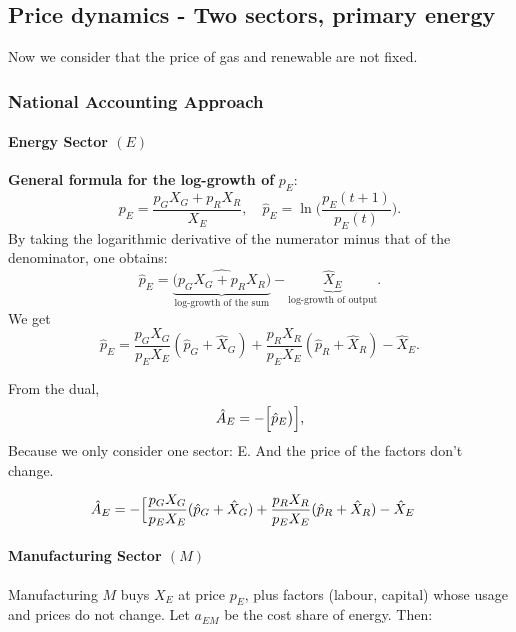 \documentclass[11pt]{article}
\begin{document}
\subsection{Price dynamics - Two sectors, primary energy}

Now we consider that the price of gas and renewable are not fixed.

\bigskip

\subsubsection{ National Accounting Approach}

\paragraph{Energy Sector \((E)\)}

\noindent
\textbf{General formula for the log-growth of }\(p_E\):
\[
  p_E 
   =  
  \frac{p_G X_G  +  p_R X_R}{ X_E },
  \quad
  \hat{p}_E  =  \ln\!\biggl(\frac{p_E(t+1)}{ p_E(t)\!}\biggr).
\]
By taking the logarithmic derivative of the numerator minus that of the denominator, one obtains:
\[
  \hat{p}_E
   = 
  \underbrace{
    \widehat{\bigl(p_G X_G + p_R X_R\bigr)}
  }_{\text{log-growth of the sum}}
   - 
  \underbrace{
    \hat{X}_E
  }_{\text{log-growth of output}}
   .
\]
We get
\[
    \hat{p}_E
     = 
    \frac{p_G X_G}{p_E X_E} 
      (\hat{p}_G + \hat{X}_G)
     + 
    \frac{p_R X_R}{p_E X_E} 
      (\hat{p}_R + \hat{X}_R)
     - 
    \hat{X}_E.
\]

From the dual,
\[
  \hat{A}_E
   = 
  - \Bigl[
        \hat{p}_E
         \bigr)
      \Bigr],
\]
Because we only consider one sector: E. And the price of the factors don't change.

\begin{align*}
     \hat{A}_E
   &= 
  - \Bigl[
        \frac{p_G X_G}{p_E X_E} 
      (\hat{p}_G + \hat{X}_G)
     + 
    \frac{p_R X_R}{p_E X_E} 
      (\hat{p}_R + \hat{X}_R)
     - 
    \hat{X}_E
\end{align*}


\paragraph{Manufacturing Sector \((M)\)}

Manufacturing $M$ buys $X_E$ at price $p_E$, plus factors (labour, capital) whose usage and prices do not change. Let $a_{EM}$ be the cost share of energy. Then:
\end{document}
